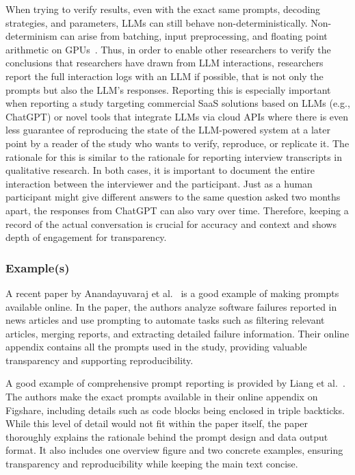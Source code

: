 When trying to verify results, even with the exact same prompts, decoding strategies, and parameters, LLMs can still behave non-deterministically.
Non-determinism can arise from batching, input preprocessing, and floating point arithmetic on GPUs~\cite{Chann2023}.
Thus, in order to enable other researchers to verify the conclusions that researchers have drawn from LLM interactions, researchers \should report the full interaction logs with an LLM if possible, that is not only the prompts but also the LLM's responses.
Reporting this is especially important when reporting a study targeting commercial SaaS solutions based on LLMs (e.g., ChatGPT) or novel tools that integrate LLMs via cloud APIs where there is even less guarantee of reproducing the state of the LLM-powered system at a later point by a reader of the study who wants to verify, reproduce, or replicate it. 
The rationale for this is similar to the rationale for reporting interview transcripts in qualitative research.
In both cases, it is important to document the entire interaction between the interviewer and the participant.
Just as a human participant might give different answers to the same question asked two months apart, the responses from ChatGPT can also vary over time.
Therefore, keeping a record of the actual conversation is crucial for accuracy and context and shows depth of engagement for transparency.


\subsubsection{Example(s)}

A recent paper by Anandayuvaraj et al.~\cite{anandayuvaraj2024fail} is a good example of making prompts available online. In the paper, the authors analyze software failures reported in news articles and use prompting to automate tasks such as filtering relevant articles, merging reports, and extracting detailed failure information. Their online appendix contains all the prompts used in the study, providing valuable transparency and supporting reproducibility.

A good example of comprehensive prompt reporting is provided by Liang et al.~\cite{Liang2024}. The authors make the exact prompts available in their online appendix on Figshare, including details such as code blocks being enclosed in triple backticks. While this level of detail would not fit within the paper itself, the paper thoroughly explains the rationale behind the prompt design and data output format. It also includes one overview figure and two concrete examples, ensuring transparency and reproducibility while keeping the main text concise.

